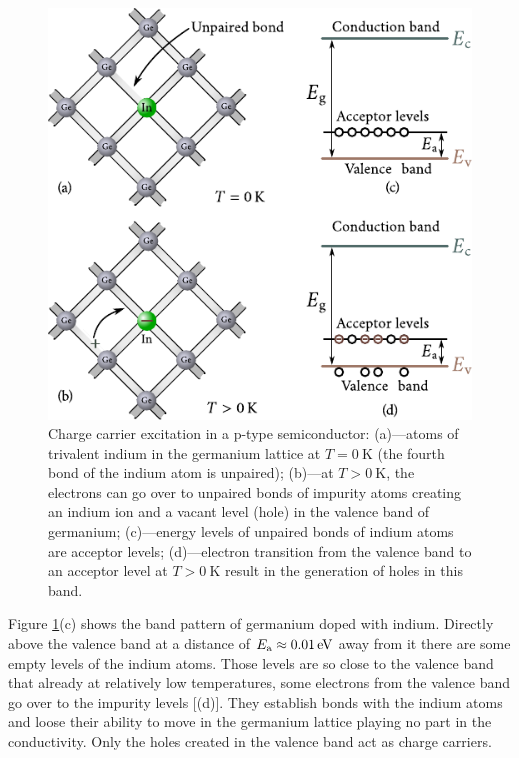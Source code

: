 \begin{figure}[t]
	\begin{center}
		\includegraphics[scale=1]{figures/ch_05/fig_5_16.pdf}
		\caption[]{Charge carrier excitation in a p-type semiconductor: (a)---atoms of trivalent indium in the germanium lattice at $T=\SI{0}{\kelvin}$ (the fourth bond of the indium atom is unpaired); (b)---at $T>\SI{0}{\kelvin}$, the electrons can go over to unpaired bonds of impurity atoms creating an indium ion and a vacant level (hole) in the valence band of germanium; (c)---energy levels of unpaired bonds of indium atoms are acceptor levels; (d)---electron transition from the valence band to an acceptor level at $T>\SI{0}{\kelvin}$ result in the generation of holes in this band.}
		\label{fig:5_16}
	\end{center}
	\vspace{-0.7cm}
\end{figure}

Figure \ref{fig:5_16}(c) shows the band pattern of germanium doped with indium. Directly above the valence band at a distance of $E_{\text{a}}\approx\SI{0.01}{\electronvolt}$ away from it there are some empty levels of the indium atoms. Those levels are so close to the valence band that already at
relatively low temperatures, some electrons from the valence band go over to the impurity levels [(d)]. They establish bonds with the indium atoms and loose their ability to move in the germanium lattice playing no part in the conductivity. Only the holes created in the valence band act as charge carriers.

